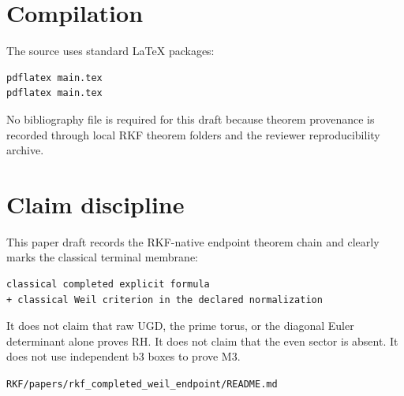 \hypertarget{compilation}{%
\section{Compilation}\label{compilation}}

The source uses standard LaTeX packages:

\begin{verbatim}
pdflatex main.tex
pdflatex main.tex
\end{verbatim}

No bibliography file is required for this draft because theorem provenance is recorded through local RKF theorem folders and the reviewer reproducibility archive.

\hypertarget{claim-discipline}{%
\section{Claim discipline}\label{claim-discipline}}

This paper draft records the RKF-native endpoint theorem chain and clearly marks the classical terminal membrane:

\begin{verbatim}
classical completed explicit formula
+ classical Weil criterion in the declared normalization
\end{verbatim}

It does not claim that raw UGD, the prime torus, or the diagonal Euler determinant alone proves RH. It does not claim that the even sector is absent. It does not use independent b3 boxes to prove M3.

\begin{flushright}\small\texttt{RKF/papers/rkf\_completed\_weil\_endpoint/README.md}\end{flushright}
